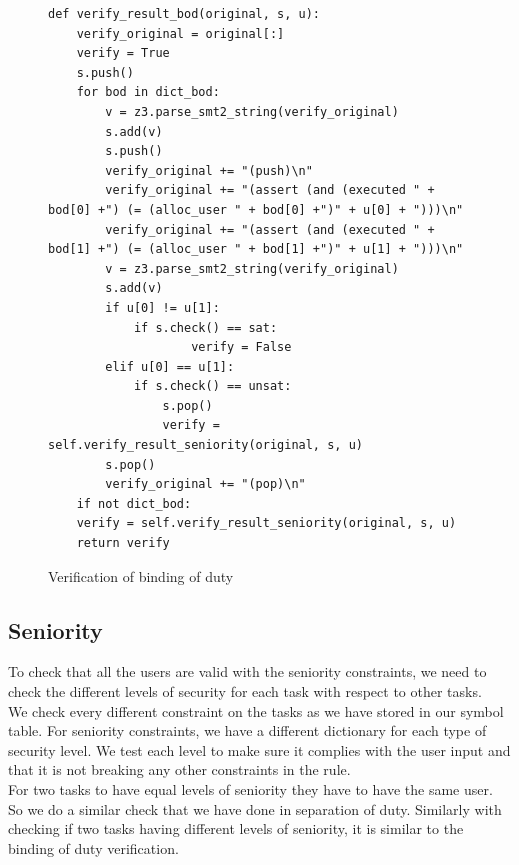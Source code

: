 \documentclass[a4paper]{report}
\begin{document}
\begin{figure}[!h]
\lstset{numbers=left, showspaces=false,
    showstringspaces=false, tabsize=2, breaklines=true,
    xleftmargin=5.0ex,
}
\begin{lstlisting}[frame=single]
def verify_result_bod(original, s, u):
	verify_original = original[:]
	verify = True
	s.push()
	for bod in dict_bod:
		v = z3.parse_smt2_string(verify_original)
		s.add(v)
		s.push()
		verify_original += "(push)\n"
		verify_original += "(assert (and (executed " + bod[0] +") (= (alloc_user " + bod[0] +")" + u[0] + ")))\n"
		verify_original += "(assert (and (executed " + bod[1] +") (= (alloc_user " + bod[1] +")" + u[1] + ")))\n"
		v = z3.parse_smt2_string(verify_original)
		s.add(v)
		if u[0] != u[1]:
			if s.check() == sat:
                    verify = False
		elif u[0] == u[1]:
			if s.check() == unsat:
				s.pop()
				verify = self.verify_result_seniority(original, s, u)
		s.pop()
		verify_original += "(pop)\n"
	if not dict_bod:
	verify = self.verify_result_seniority(original, s, u)
	return verify
\end{lstlisting}
\caption{Verification of binding of duty}
\label{fig:Verification of binding of duty}
\end{figure}

\newpage

\subsection{Seniority}
To check that all the users are valid with the seniority constraints, we need to check the different levels of security for each task with respect to other tasks. \\

We check every different constraint on the tasks as we have stored in our symbol table. For seniority constraints, we have a different dictionary for each type of security level. We test each level to make sure it complies with the user input and that it is not breaking any other constraints in the rule.\\

For two tasks to have equal levels of seniority they have to have the same user. So we do a similar check that we have done in separation of duty. Similarly with checking if two tasks having different levels of seniority, it is similar to the binding of duty verification. \\
\end{document}
